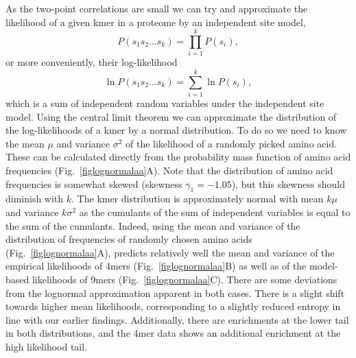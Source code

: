\documentclass[superscriptaddress,twocolumn,pre]{revtex4}
\newcommand{\<}{\langle}
\renewcommand{\>}{\rangle}
\begin{document}
As the two-point correlations are small we can try and approximate the likelihood of a given kmer in a proteome by an independent site model,
\begin{equation}
    P(s_1s_2 ... s_k) = \prod_{i=1}^k P(s_i),
\end{equation}
or more conveniently, their log-likelihood
\begin{equation}
    \ln P(s_1s_2 ... s_k) = \sum_{i=1}^k \ln P(s_i),
\end{equation}
which is a sum of independent random variables under the independent site model.
Using the central limit theorem we can approximate the distribution of the log-likelihoods of a kmer by a normal distribution. To do so we need to know the mean $\mu$ and variance $\sigma^2$ of the likelihood of a randomly picked amino acid. These can be calculated directly from the probability mass function of amino acid frequencies (Fig.~\ref{figlognormalaa}A). Note that the distribution of amino acid frequencies is somewhat skewed (skewness $\gamma_1 = -1.05$), but this skewness should diminish with $k$. The kmer distribution is approximately normal with mean $k \mu$ and variance $k \sigma^2$ as the cumulants of the sum of independent variables is equal to the sum of the cumulants.  Indeed, using the mean and variance of the distribution of frequencies of randomly chosen amino acids (Fig.~\ref{figlognormalaa}A), predicts relatively well the mean and variance of the empirical likelihoods of 4mers (Fig.~\ref{figlognormalaa}B) as well as of the model-based likelihoods of 9mers (Fig.~\ref{figlognormalaa}C). There are some deviations from the lognormal approximation apparent in both cases. There is a slight shift towards higher mean likelihoods, corresponding to a slightly reduced entropy in line with our earlier findings. Additionally, there are enrichments at the lower tail in both distributions, and the 4mer data shows an additional enrichment at the high likelihood tail.
\end{document}
